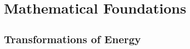 
 







 














\part{Mathematical Foundations}


\iffalse  %
\chapter{Transformations of Energy}



